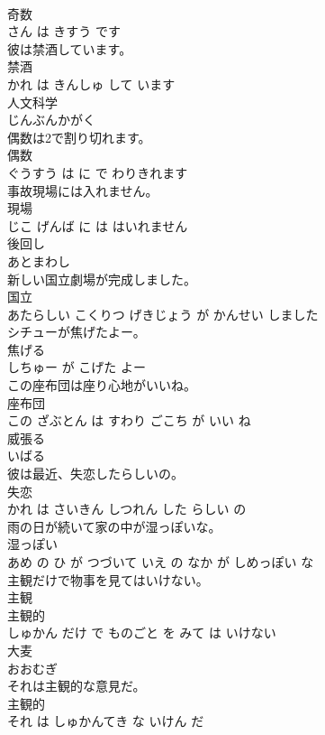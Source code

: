 \documentclass[8pt]{extreport}
\begin{document}
\begin{CJK}{UTF8}{min}
\\	奇数 
\\	さん は きすう です			
\\	彼は禁酒しています。	
\\	禁酒 
\\	かれ は きんしゅ して います			
\\	人文科学	
\\	じんぶんかがく		
\\	偶数は2で割り切れます。	
\\	偶数 
\\	ぐうすう は に で わりきれます			
\\	事故現場には入れません。	
\\	現場 
\\	じこ げんば に は はいれません			
\\	後回し	
\\	あとまわし		
\\	新しい国立劇場が完成しました。	
\\	国立 
\\	あたらしい こくりつ げきじょう が かんせい しました			
\\	シチューが焦げたよー。	
\\	焦げる 
\\	しちゅー が こげた よー			
\\	この座布団は座り心地がいいね。	
\\	座布団 
\\	この ざぶとん は すわり ごこち が いい ね			
\\	威張る	
\\	いばる		
\\	彼は最近、失恋したらしいの。	
\\	失恋 
\\	かれ は さいきん しつれん した らしい の			
\\	雨の日が続いて家の中が湿っぽいな。	
\\	湿っぽい 
\\	あめ の ひ が つづいて いえ の なか が しめっぽい な			
\\	主観だけで物事を見てはいけない。	
\\	主観 
\\	主観的 
\\	しゅかん だけ で ものごと を みて は いけない			
\\	大麦	
\\	おおむぎ		
\\	それは主観的な意見だ。	
\\	主観的 
\\	それ は しゅかんてき な いけん だ			

\end{CJK}
\end{document}

